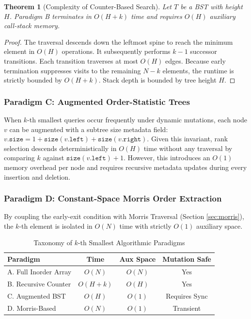 \documentclass[10pt,twocolumn,letterpaper]{article}
\newtheorem{theorem}{Theorem}
\begin{document}
\begin{theorem}[Complexity of Counter-Based Search]
Let $T$ be a BST with height $H$. Paradigm B terminates in $O(H + k)$ time and requires $O(H)$ auxiliary call-stack memory.
\end{theorem}

\begin{proof}
The traversal descends down the leftmost spine to reach the minimum element in $O(H)$ operations. It subsequently performs $k-1$ successor transitions. Each transition traverses at most $O(H)$ edges. Because early termination suppresses visits to the remaining $N-k$ elements, the runtime is strictly bounded by $O(H + k)$. Stack depth is bounded by tree height $H$.
\end{proof}

\subsubsection{Paradigm C: Augmented Order-Statistic Trees}
When $k$-th smallest queries occur frequently under dynamic mutations, each node $v$ can be augmented with a subtree size metadata field: $v.\texttt{size} = 1 + \texttt{size}(v.\texttt{left}) + \texttt{size}(v.\texttt{right})$.
Given this invariant, rank selection descends deterministically in $O(H)$ time without any traversal by comparing $k$ against $\texttt{size}(v.\texttt{left}) + 1$. However, this introduces an $O(1)$ memory overhead per node and requires recursive metadata updates during every insertion and deletion.

\subsubsection{Paradigm D: Constant-Space Morris Order Extraction}
By coupling the early-exit condition with Morris Traversal (Section \ref{sec:morris}), the $k$-th element is isolated in $O(N)$ time with strictly $O(1)$ auxiliary space.

\begin{table}[h]
\centering
\caption{Taxonomy of $k$-th Smallest Algorithmic Paradigms}
\label{tab:kth-smallest}
\begin{tabular}{lccc}
\toprule
\textbf{Paradigm} & \textbf{Time} & \textbf{Aux Space} & \textbf{Mutation Safe} \\
\midrule
A. Full Inorder Array & $O(N)$ & $O(N)$ & Yes \\
B. Recursive Counter & $O(H + k)$ & $O(H)$ & Yes \\
C. Augmented BST & $O(H)$ & $O(1)$ & Requires Sync \\
D. Morris-Based & $O(N)$ & $O(1)$ & Transient \\
\bottomrule
\end{tabular}
\end{table}
\end{document}
